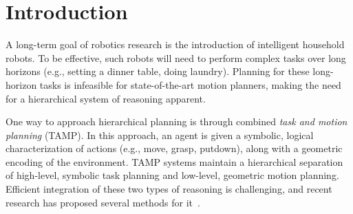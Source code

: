 \section{Introduction}
A long-term goal of robotics research is the introduction of intelligent household robots.
To be effective, such robots will need to perform complex tasks
over long horizons (e.g., setting a dinner table, doing laundry). Planning for these long-horizon tasks is infeasible
for state-of-the-art motion planners, making the need
for a hierarchical system of reasoning apparent.

One way to approach hierarchical planning is through combined \emph{task and motion planning} (TAMP). In this
approach, an agent is given a symbolic, logical characterization of actions (e.g., move, grasp,
putdown), along with a geometric encoding of the environment.
TAMP systems maintain a hierarchical separation of high-level, symbolic task planning
and low-level, geometric motion planning.
Efficient integration of these two types of reasoning is challenging, and recent research has
proposed several methods for it~\cite{srivastava2014combined, kaelbling2011hierarchical,
lagriffoul2014orientation, GarrettWAFR14, dornhege2012semantic}.

